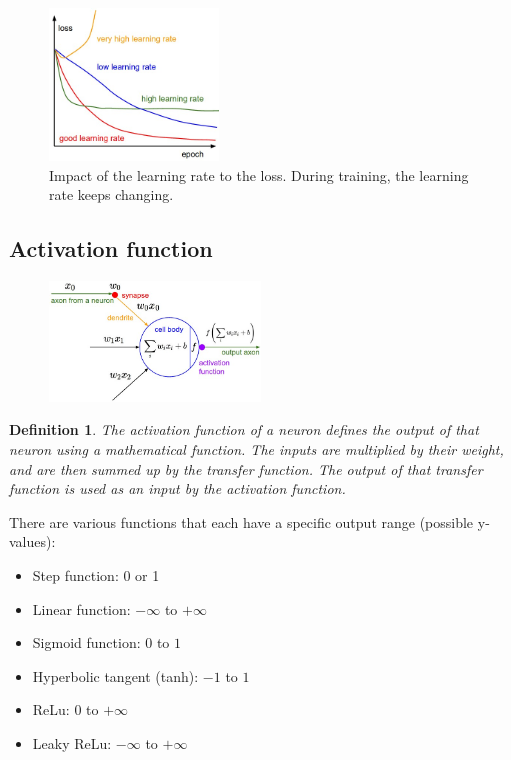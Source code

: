\documentclass{article}
\newtheorem{theorem}{Definition}[section]
\begin{document}
\begin{figure}[H]
    \centering
    \includegraphics[width=0.4\textwidth]{backpropagation-learning-rate.png}
    \caption{Impact of the learning rate to the loss. During training, the learning rate keeps changing.}
\end{figure}

\subsection{Activation function}

\begin{figure}[H]
    \centering
    \includegraphics[width=0.5\textwidth]{activation-function.png}
\end{figure}


\begin{theorem}
    The activation function of a neuron defines the output of that neuron using a mathematical function.
    The inputs are multiplied by their weight, and are then summed up by the transfer function.
    The output of that transfer function is used as an input by the activation function.
\end{theorem}

There are various functions that each have a specific output range (possible y-values):


\begin{itemize}
    \item Step function: 0 or 1
    \item Linear function: $-\infty$ to $+\infty$
    \item Sigmoid function: $0$ to $1$
    \item Hyperbolic tangent (tanh): $-1$ to $1$
    \item ReLu: $0$ to $+\infty$
    \item Leaky ReLu: $-\infty$ to $+\infty$
\end{itemize}
\end{document}
